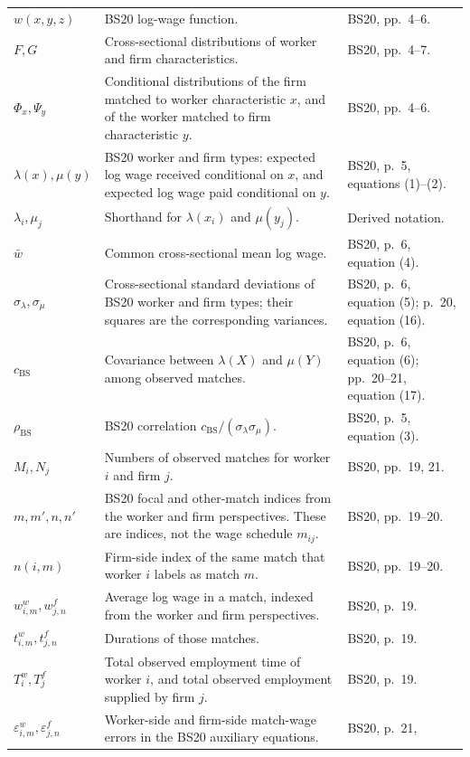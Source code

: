\documentclass[11pt]{article}
\begin{document}
\begin{longtable}{p{}p{}p{}}
\(w(x,y,z)\) & BS20 log-wage function. & BS20, pp.\ 4--6. \\
\(F,G\) & Cross-sectional distributions of worker and firm characteristics. &
BS20, pp.\ 4--7. \\
\(\Phi_x,\Psi_y\) & Conditional distributions of the firm matched to worker
characteristic \(x\), and of the worker matched to firm characteristic \(y\).
& BS20, pp.\ 4--6. \\
\(\lambda(x),\mu(y)\) & BS20 worker and firm types: expected log wage received
conditional on \(x\), and expected log wage paid conditional on \(y\). &
BS20, p.\ 5, equations (1)--(2). \\
\(\lambda_i,\mu_j\) & Shorthand for \(\lambda(x_i)\) and \(\mu(y_j)\). &
Derived notation. \\
\(\bar w\) & Common cross-sectional mean log wage. & BS20, p.\ 6,
equation (4). \\
\(\sigma_\lambda,\sigma_\mu\) & Cross-sectional standard deviations of BS20
worker and firm types; their squares are the corresponding variances. &
BS20, p.\ 6, equation (5); p.\ 20, equation (16). \\
\(c_{\mathrm{BS}}\) & Covariance between \(\lambda(X)\) and \(\mu(Y)\) among
observed matches. & BS20, p.\ 6, equation (6); pp.\ 20--21, equation (17). \\
\(\rho_{\mathrm{BS}}\) & BS20 correlation
\(c_{\mathrm{BS}}/(\sigma_\lambda\sigma_\mu)\). & BS20, p.\ 5,
equation (3). \\
\(M_i,N_j\) & Numbers of observed matches for worker \(i\) and firm \(j\). &
BS20, pp.\ 19, 21. \\
\(m,m',n,n'\) & BS20 focal and other-match indices from the worker and firm
perspectives.  These are indices, not the wage schedule \(m_{ij}\). &
BS20, pp.\ 19--20. \\
\(n(i,m)\) & Firm-side index of the same match that worker \(i\) labels as
match \(m\). & BS20, pp.\ 19--20. \\
\(w^w_{i,m},w^f_{j,n}\) & Average log wage in a match, indexed from the worker
and firm perspectives. & BS20, p.\ 19. \\
\(t^w_{i,m},t^f_{j,n}\) & Durations of those matches. & BS20, p.\ 19. \\
\(T_i^w,T_j^f\) & Total observed employment time of worker \(i\), and total
observed employment supplied by firm \(j\). & BS20, p.\ 19. \\
\(\varepsilon^w_{i,m},\varepsilon^f_{j,n}\) & Worker-side and firm-side
match-wage errors in the BS20 auxiliary equations. & BS20, p.\ 21,

\end{longtable}
\end{document}

